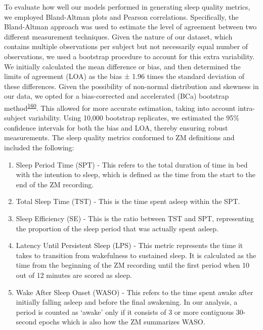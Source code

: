 \documentclass[
  10pt,
]{scrbook}
\providecommand{\tightlist}{%
  \setlength{\itemsep}{0pt}\setlength{\parskip}{0pt}}\usepackage{longtable,booktabs,array}
\begin{document}
To evaluate how well our models performed in generating sleep quality
metrics, we employed Bland-Altman plots and Pearson correlations.
Specifically, the Bland-Altman approach was used to estimate the level
of agreement between two different measurement techniques. Given the
nature of our dataset, which contains multiple observations per subject
but not necessarily equal number of observations, we used a bootstrap
procedure to account for this extra variability. We initially calculated
the mean difference or bias, and then determined the limits of agreement
(LOA) as the bias ± 1.96 times the standard deviation of these
differences. Given the possibility of non-normal distribution and
skewness in our data, we opted for a bias-corrected and accelerated
(BCa) bootstrap
method\textsuperscript{\protect\hyperlink{ref-diciccio_bootstrap_1996}{160}}.
This allowed for more accurate estimation, taking into account
intra-subject variability. Using 10,000 bootstrap replicates, we
estimated the 95\% confidence intervals for both the bias and LOA,
thereby ensuring robust measurements. The sleep quality metrics
conformed to ZM definitions and included the following:

\begin{enumerate}
\def\labelenumi{\arabic{enumi}.}
\tightlist
\item
  Sleep Period Time (SPT) - This refers to the total duration of time in
  bed with the intention to sleep, which is defined as the time from the
  start to the end of the ZM recording.
\item
  Total Sleep Time (TST) - This is the time spent asleep within the SPT.
\item
  Sleep Efficiency (SE) - This is the ratio between TST and SPT,
  representing the proportion of the sleep period that was actually
  spent asleep.
\item
  Latency Until Persistent Sleep (LPS) - This metric represents the time
  it takes to transition from wakefulness to sustained sleep. It is
  calculated as the time from the beginning of the ZM recording until
  the first period when 10 out of 12 minutes are scored as sleep.
\item
  Wake After Sleep Onset (WASO) - This refers to the time spent awake
  after initially falling asleep and before the final awakening. In our
  analysis, a period is counted as `awake' only if it consists of 3 or
  more contiguous 30-second epochs which is also how the ZM summarizes
  WASO.
\end{enumerate}
\end{document}
